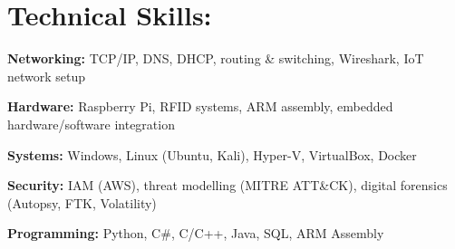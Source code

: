 \section{Technical Skills:}
\itemizeBegin
  \item \textbf{Networking:} TCP/IP, DNS, DHCP, routing \& switching, Wireshark, IoT network setup
  \item \textbf{Hardware:} Raspberry Pi, RFID systems, ARM assembly, embedded hardware/software integration
  \item \textbf{Systems:} Windows, Linux (Ubuntu, Kali), Hyper-V, VirtualBox, Docker
  \item \textbf{Security:} IAM (AWS), threat modelling (MITRE ATT\&CK), digital forensics (Autopsy, FTK, Volatility)
  \item \textbf{Programming:} Python, C\#, C/C++, Java, SQL, ARM Assembly
\itemizeEnd